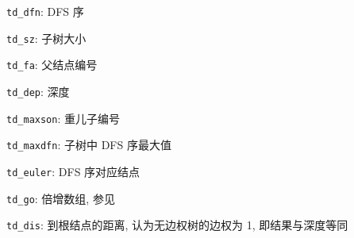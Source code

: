\verb|td_dfn|: DFS 序

\verb|td_sz|: 子树大小

\verb|td_fa|: 父结点编号

\verb|td_dep|: 深度

\verb|td_maxson|: 重儿子编号

\verb|td_maxdfn|: 子树中 DFS 序最大值

\verb|td_euler|: DFS 序对应结点

\verb|td_go|: 倍增数组, 参见 

\verb|td_dis|: 到根结点的距离, 认为无边权树的边权为 1, 即结果与深度等同
